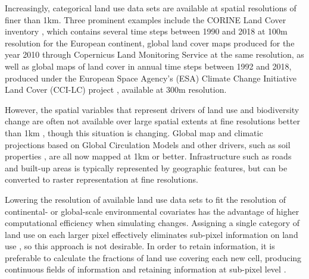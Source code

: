 \documentclass[titlesmallcaps,copyrightpage]{uomthesis}\usepackage[]{graphicx}\usepackage[]{color}
\begin{document}
Increasingly, categorical land use data sets are available at spatial
resolutions of finer than 1km. Three prominent examples include the
CORINE Land Cover inventory \citep{bossard_corine_2000}, which contains
several time steps between 1990 and 2018 at 100m resolution for the
European continent, global land cover maps produced for the year 2010
through Copernicus Land Monitoring Service
\citep{european_union_copernicus_2019} at the same resolution, as well
as global maps of land cover in annual time steps between 1992 and 2018,
produced under the European Space Agency's (ESA) Climate Change
Initiative Land Cover (CCI-LC) project \citep{esa_land_2019}, available
at 300m resolution.

However, the spatial variables that represent drivers of land use and
biodiversity change are often not available over large spatial extents
at fine resolutions better than 1km \citep{dendoncker_statistical_2006},
though this situation is changing. Global map and climatic projections
based on Global Circulation Models \citep{hijmans_very_2005} and other
drivers, such as soil properties
\citep{global_soil_data_task_group_global_2000}, are all now mapped at
1km or better. Infrastructure such as roads
\citep{ciesn_global_2013}
and built-up areas \citep{fao_built-up_1997} is typically represented by
geographic features, but can be converted to raster representation at
fine resolutions.

Lowering the resolution of available land use data sets to fit the
resolution of continental- or global-scale environmental covariates has
the advantage of higher computational efficiency when simulating
changes. Assigning a single category of land use on each larger pixel
effectively eliminates sub-pixel information on land use
\citep{seo_mapping_2016}, so this approach is not desirable. In order to
retain information, it is preferable to calculate the fractions of land
use covering each new cell, producing continuous fields of information
and retaining information at sub-pixel level \citep{seo_mapping_2016}.
\end{document}
